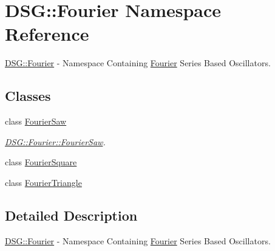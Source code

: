 \hypertarget{namespace_d_s_g_1_1_fourier}{\section{D\+S\+G\+:\+:Fourier Namespace Reference}
\label{namespace_d_s_g_1_1_fourier}
}


\hyperlink{namespace_d_s_g_1_1_fourier}{D\+S\+G\+::\+Fourier} -\/ Namespace Containing \hyperlink{namespace_d_s_g_1_1_fourier}{Fourier} Series Based Oscillators.  


\subsection*{Classes}
\begin{DoxyCompactItemize}
\item 
class \hyperlink{class_d_s_g_1_1_fourier_1_1_fourier_saw}{Fourier\+Saw}
\begin{DoxyCompactList}\small\item\em \hyperlink{class_d_s_g_1_1_fourier_1_1_fourier_saw}{D\+S\+G\+::\+Fourier\+::\+Fourier\+Saw}. \end{DoxyCompactList}\item 
class \hyperlink{class_d_s_g_1_1_fourier_1_1_fourier_square}{Fourier\+Square}
\item 
class \hyperlink{class_d_s_g_1_1_fourier_1_1_fourier_triangle}{Fourier\+Triangle}
\end{DoxyCompactItemize}


\subsection{Detailed Description}
\hyperlink{namespace_d_s_g_1_1_fourier}{D\+S\+G\+::\+Fourier} -\/ Namespace Containing \hyperlink{namespace_d_s_g_1_1_fourier}{Fourier} Series Based Oscillators. 